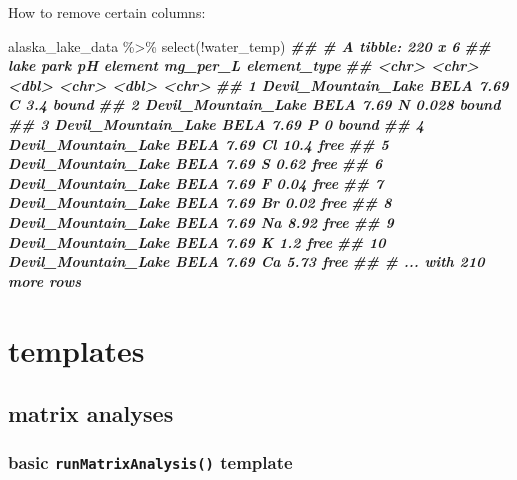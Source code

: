 \documentclass[
]{krantz}
\newenvironment{Shaded}{\begin{snugshade}}{\end{snugshade}}
\newcommand{\DocumentationTok}[1]{\textcolor[rgb]{0.56,0.35,0.01}{\textbf{\textit{#1}}}}
\newcommand{\FunctionTok}[1]{\textcolor[rgb]{0.00,0.00,0.00}{#1}}
\newcommand{\NormalTok}[1]{#1}
\newcommand{\SpecialCharTok}[1]{\textcolor[rgb]{0.00,0.00,0.00}{#1}}
\begin{document}
How to remove certain columns:

\begin{Shaded}
\begin{Highlighting}[]
\NormalTok{alaska\_lake\_data }\SpecialCharTok{\%\textgreater{}\%}
  \FunctionTok{select}\NormalTok{(}\SpecialCharTok{!}\NormalTok{water\_temp)}
\DocumentationTok{\#\# \# A tibble: 220 x 6}
\DocumentationTok{\#\#    lake                park     pH element mg\_per\_L element\_type}
\DocumentationTok{\#\#    \textless{}chr\textgreater{}               \textless{}chr\textgreater{} \textless{}dbl\textgreater{} \textless{}chr\textgreater{}      \textless{}dbl\textgreater{} \textless{}chr\textgreater{}       }
\DocumentationTok{\#\#  1 Devil\_Mountain\_Lake BELA   7.69 C          3.4   bound       }
\DocumentationTok{\#\#  2 Devil\_Mountain\_Lake BELA   7.69 N          0.028 bound       }
\DocumentationTok{\#\#  3 Devil\_Mountain\_Lake BELA   7.69 P          0     bound       }
\DocumentationTok{\#\#  4 Devil\_Mountain\_Lake BELA   7.69 Cl        10.4   free        }
\DocumentationTok{\#\#  5 Devil\_Mountain\_Lake BELA   7.69 S          0.62  free        }
\DocumentationTok{\#\#  6 Devil\_Mountain\_Lake BELA   7.69 F          0.04  free        }
\DocumentationTok{\#\#  7 Devil\_Mountain\_Lake BELA   7.69 Br         0.02  free        }
\DocumentationTok{\#\#  8 Devil\_Mountain\_Lake BELA   7.69 Na         8.92  free        }
\DocumentationTok{\#\#  9 Devil\_Mountain\_Lake BELA   7.69 K          1.2   free        }
\DocumentationTok{\#\# 10 Devil\_Mountain\_Lake BELA   7.69 Ca         5.73  free        }
\DocumentationTok{\#\# \# ... with 210 more rows}
\end{Highlighting}
\end{Shaded}

\hypertarget{templates}{%
\section{templates}\label{templates}}

\hypertarget{matrix-analyses}{%
\subsection{matrix analyses}\label{matrix-analyses}}

\hypertarget{basic-runmatrixanalysis-template}{%
\subsubsection{\texorpdfstring{basic \texttt{runMatrixAnalysis()} template}{basic runMatrixAnalysis() template}}\label{basic-runmatrixanalysis-template}}
\end{document}
